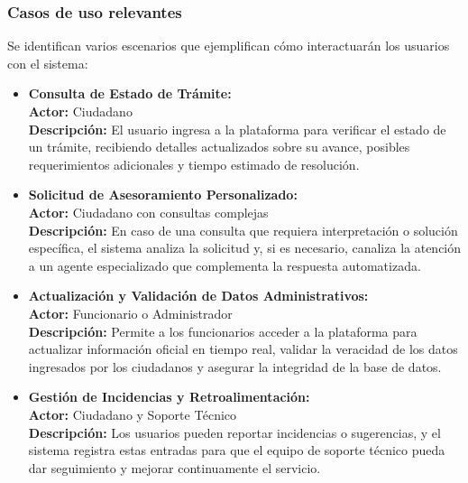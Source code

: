 \subsubsection{Casos de uso relevantes}
Se identifican varios escenarios que ejemplifican cómo interactuarán los usuarios con el sistema:
\begin{itemize}
    \item \textbf{Consulta de Estado de Trámite:} \\
    \textbf{Actor:} Ciudadano \\
    \textbf{Descripción:} El usuario ingresa a la plataforma para verificar el estado de un trámite, recibiendo detalles actualizados sobre su avance, posibles requerimientos adicionales y tiempo estimado de resolución.
    \item \textbf{Solicitud de Asesoramiento Personalizado:} \\
    \textbf{Actor:} Ciudadano con consultas complejas \\
    \textbf{Descripción:} En caso de una consulta que requiera interpretación o solución específica, el sistema analiza la solicitud y, si es necesario, canaliza la atención a un agente especializado que complementa la respuesta automatizada.
    \item \textbf{Actualización y Validación de Datos Administrativos:} \\
    \textbf{Actor:} Funcionario o Administrador \\
    \textbf{Descripción:} Permite a los funcionarios acceder a la plataforma para actualizar información oficial en tiempo real, validar la veracidad de los datos ingresados por los ciudadanos y asegurar la integridad de la base de datos.
    \item \textbf{Gestión de Incidencias y Retroalimentación:} \\
    \textbf{Actor:} Ciudadano y Soporte Técnico \\
    \textbf{Descripción:} Los usuarios pueden reportar incidencias o sugerencias, y el sistema registra estas entradas para que el equipo de soporte técnico pueda dar seguimiento y mejorar continuamente el servicio.
\end{itemize}

